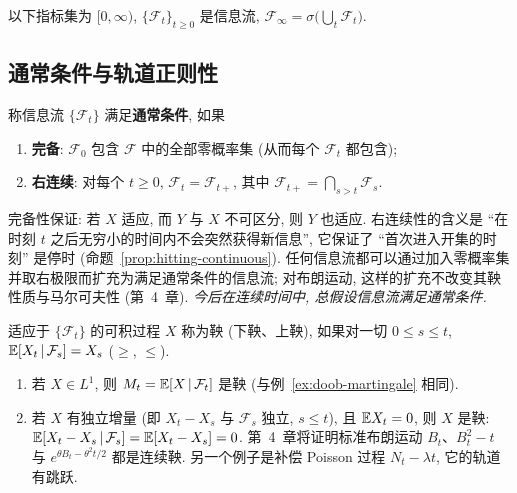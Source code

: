 以下指标集为 $[0,\infty)$, $\{\mathcal{F}_t\}_{t\ge0}$ 是信息流, $\mathcal{F}_\infty=\sigma\big(\bigcup_t\mathcal{F}_t\big)$.

\subsection{通常条件与轨道正则性}

\begin{definition}[通常条件]\label{def:usual-conditions}
称信息流 $\{\mathcal{F}_t\}$ 满足\textbf{通常条件}, 如果
\begin{enumerate}
\item \textbf{完备}: $\mathcal{F}_0$ 包含 $\mathcal{F}$ 中的全部零概率集 (从而每个 $\mathcal{F}_t$ 都包含);
\item \textbf{右连续}: 对每个 $t\ge0$, $\mathcal{F}_t=\mathcal{F}_{t+}$, 其中 $\mathcal{F}_{t+}=\bigcap_{s>t}\mathcal{F}_s$.
\end{enumerate}
\end{definition}

完备性保证: 若 $X$ 适应, 而 $Y$ 与 $X$ 不可区分, 则 $Y$ 也适应. 右连续性的含义是 ``在时刻 $t$ 之后无穷小的时间内不会突然获得新信息'', 它保证了 ``首次进入开集的时刻'' 是停时 (命题~\ref{prop:hitting-continuous}). 任何信息流都可以通过加入零概率集并取右极限而扩充为满足通常条件的信息流; 对布朗运动, 这样的扩充不改变其鞅性质与马尔可夫性 (第~4~章). \emph{今后在连续时间中, 总假设信息流满足通常条件.}

\begin{definition}[连续时间鞅]\label{def:ct-martingale}
适应于 $\{\mathcal{F}_t\}$ 的可积过程 $X$ 称为鞅 (下鞅、上鞅), 如果对一切 $0\le s\le t$, $\mathbb{E}[X_t\,|\,\mathcal{F}_s]=X_s$ ($\ge$, $\le$).
\end{definition}

\begin{example}\label{ex:ct-martingales}
\begin{enumerate}
\item 若 $X\in L^1$, 则 $M_t=\mathbb{E}[X\,|\,\mathcal{F}_t]$ 是鞅 (与例~\ref{ex:doob-martingale} 相同).
\item 若 $X$ 有独立增量 (即 $X_t-X_s$ 与 $\mathcal{F}_s$ 独立, $s\le t$), 且 $\mathbb{E} X_t=0$, 则 $X$ 是鞅: $\mathbb{E}[X_t-X_s\,|\,\mathcal{F}_s]=\mathbb{E}[X_t-X_s]=0$. 第~4~章将证明标准布朗运动 $B_t$、$B_t^2-t$ 与 $e^{\theta B_t-\theta^2t/2}$ 都是连续鞅. 另一个例子是补偿 Poisson 过程 $N_t-\lambda t$, 它的轨道有跳跃.
\end{enumerate}
\end{example}

